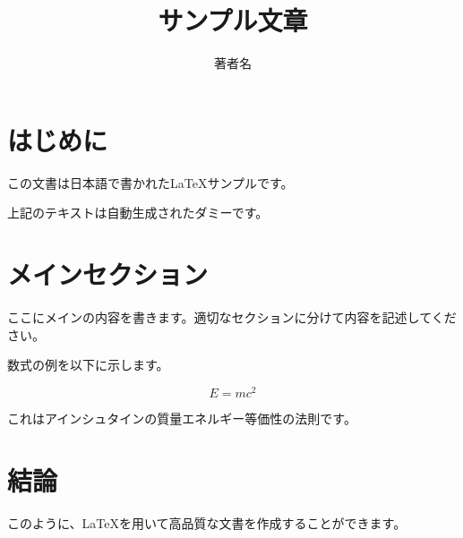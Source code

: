 \documentclass[a4paper,11pt]{jsarticle}
\title{サンプル文章}
\author{著者名}
\begin{document}
\maketitle

\section{はじめに}
この文書は日本語で書かれたLaTeXサンプルです。

\lipsum[1] %

上記のテキストは自動生成されたダミーです。

\section{メインセクション}
ここにメインの内容を書きます。適切なセクションに分けて内容を記述してください。


数式の例を以下に示します。

\begin{equation}
E = mc^2
\end{equation}

これはアインシュタインの質量エネルギー等価性の法則です。

\section{結論}
このように、LaTeXを用いて高品質な文書を作成することができます。
\end{document}
